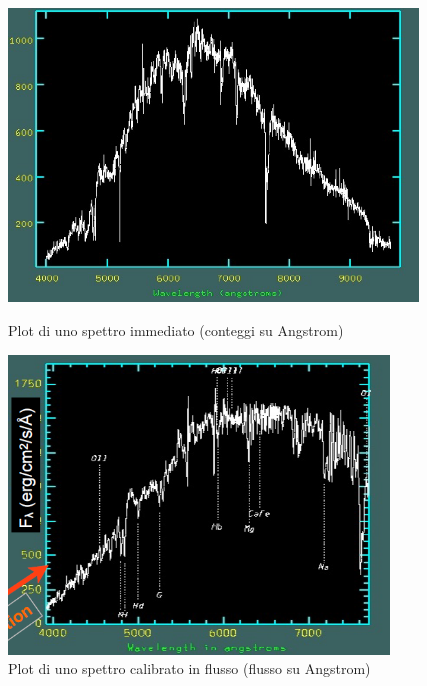 \begin{figure}[htpb]
    \centering
    \begin{minipage}[c]{0.4\textwidth}
        \centering \setlength{\captionmargin}{0pt}
        \includegraphics[width=0.97\textwidth]{Immagini/Capitolo3/Spettro_conteggi_plottato.PNG}
        \caption{Plot di uno spettro immediato (conteggi su Angstrom)}
        \label{im:spettro-plot-conteggi}
    \end{minipage}
    \hspace{5mm}
    \begin{minipage}[c]{0.4\textwidth}
        \centering \setlength{\captionmargin}{0pt}
        \includegraphics[width=0.9\textwidth]{Immagini/Capitolo3/Spettro_calibrato_flusso_plottato.PNG}
        \caption{Plot di uno spettro calibrato in flusso (flusso su Angstrom)}
        \label{im:spettro-plot-calibrato-flusso}
    \end{minipage}
\end{figure}

